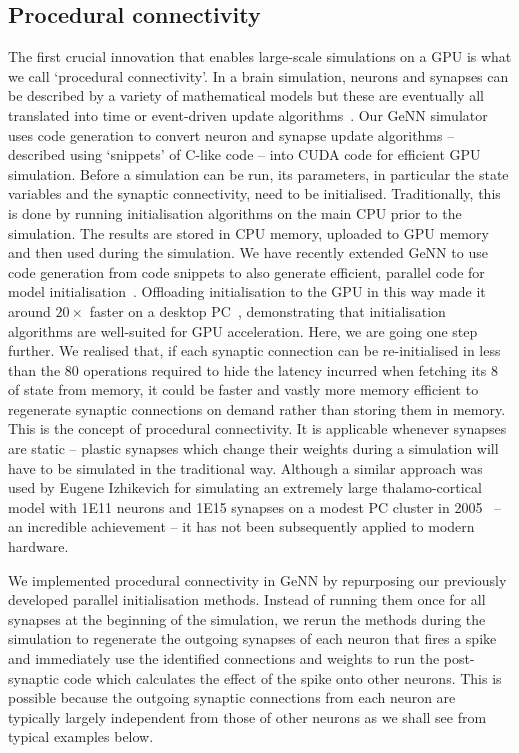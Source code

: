\documentclass[9pt,a4paper]{amsart}
\begin{document}
\subsection{Procedural connectivity}
\label{sec:results/procedural}
The first crucial innovation that enables large-scale simulations on a GPU is what we call `procedural connectivity'.
In a brain simulation, neurons and synapses can be described by a variety of mathematical models but these are eventually all translated into time or event-driven update algorithms~\citep{Brette2007}.
Our GeNN simulator~\citep{Yavuz2016} uses code generation to convert neuron and synapse update algorithms -- described using `snippets' of C-like code -- into CUDA code for efficient GPU simulation.
Before a simulation can be run, its parameters, in particular the state variables and the synaptic connectivity, need to be initialised.
Traditionally, this is done by running initialisation algorithms on the main CPU prior to the simulation.
The results are stored in CPU memory, uploaded to GPU memory and then used during the simulation.
We have recently extended GeNN to use code generation from code snippets to also generate efficient, parallel code for model initialisation~\citep{Knight2018}.
Offloading initialisation to the GPU in this way made it around $20\times$ faster on a desktop PC~\citep{Knight2018}, demonstrating that initialisation algorithms are well-suited for GPU acceleration.
Here, we are going one step further.
We realised that, if each synaptic connection can be re-initialised in less than the 80 operations required to hide the latency incurred when fetching its \SI{8}{\byte} of state from memory, it could be faster and vastly more memory efficient to regenerate synaptic connections on demand rather than storing them in memory.
This is the concept of procedural connectivity.
It is applicable whenever synapses are static -- plastic synapses which change their weights during a simulation will have to be simulated in the traditional way.
Although a similar approach was used by Eugene Izhikevich for simulating an extremely large thalamo-cortical model with \num{1E11} neurons and \num{1E15} synapses on a modest PC cluster in 2005~\citep{Izhikevich2005} -- an incredible achievement -- it has not been subsequently applied to modern hardware.

We implemented procedural connectivity in GeNN by repurposing our previously developed parallel initialisation methods.
Instead of running them once for all synapses at the beginning of the simulation, we rerun the methods during the simulation to regenerate the outgoing synapses of each neuron that fires a spike and immediately use the identified connections and weights to run the post-synaptic code which calculates the effect of the spike onto other neurons.
This is possible because the outgoing synaptic connections from each neuron are typically largely independent from those of other neurons as we shall see from typical examples below.
\end{document}
